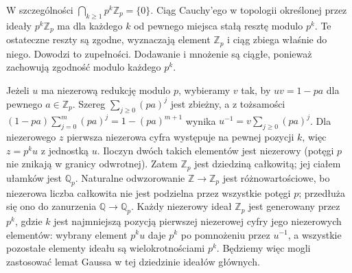 W szczególności $\bigcap_{k\ge1}p^k\mathbb Z_p=\{0\}$.
Ciąg Cauchy'ego w topologii określonej przez ideały
$p^k\mathbb Z_p$ ma dla każdego $k$ od pewnego miejsca stałą
resztę modulo $p^k$. Te ostateczne reszty są zgodne, wyznaczają
element $\mathbb Z_p$ i ciąg zbiega właśnie do niego.
Dowodzi to zupełności. Dodawanie i mnożenie są ciągłe,
ponieważ zachowują zgodność modulo każdego $p^k$.

Jeżeli $u$ ma niezerową redukcję modulo $p$, wybieramy
$v$ tak, by $uv=1-pa$ dla pewnego $a\in\mathbb Z_p$.
Szereg $\sum_{j\ge0}(pa)^j$ jest zbieżny, a z tożsamości
$(1-pa)\sum_{j=0}^m(pa)^j=1-(pa)^{m+1}$ wynika
$u^{-1}=v\sum_{j\ge0}(pa)^j$.
Dla niezerowego $z$ pierwsza niezerowa cyfra występuje
na pewnej pozycji $k$, więc $z=p^k u$ z jednostką $u$.
Iloczyn dwóch takich elementów jest niezerowy
(potęgi $p$ nie znikają w granicy odwrotnej).
Zatem $\mathbb Z_p$ jest dziedziną całkowitą; jej ciałem
ułamków jest $\mathbb Q_p$. Naturalne odwzorowanie
$\mathbb Z\to\mathbb Z_p$ jest różnowartościowe, bo niezerowa
liczba całkowita nie jest podzielna przez wszystkie potęgi $p$;
przedłuża się ono do zanurzenia $\mathbb Q\to\mathbb Q_p$.
Każdy niezerowy ideał $\mathbb Z_p$ jest generowany przez
$p^k$, gdzie $k$ jest najmniejszą pozycją pierwszej niezerowej
cyfry jego niezerowych elementów: wybrany element $p^ku$
daje $p^k$ po pomnożeniu przez $u^{-1}$, a wszystkie pozostałe
elementy ideału są wielokrotnościami $p^k$.
Będziemy więc mogli zastosować lemat Gaussa w tej dziedzinie
ideałów głównych.


